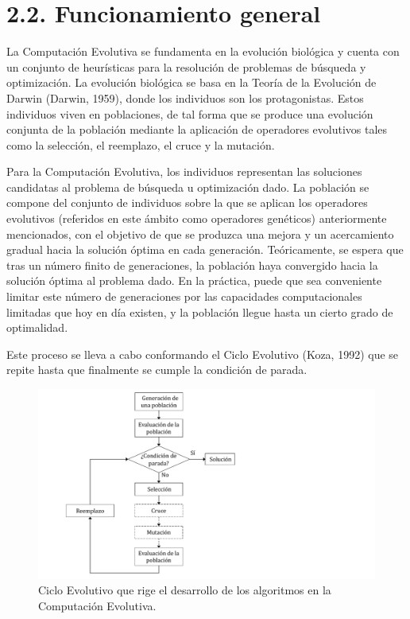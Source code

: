 \documentclass[spanish,a4paper,12pt,twoside]{report}
\begin{document}
  \section*{\Large 2.2. Funcionamiento general}
  La Computación Evolutiva se fundamenta en la evolución biológica y cuenta con un conjunto de heurísticas para la resolución de problemas de búsqueda y optimización. La evolución biológica se basa en la Teoría de la Evolución de Darwin (Darwin, 1959), donde los individuos son los protagonistas. Estos individuos viven en poblaciones, de tal forma que se produce una evolución conjunta de la población mediante la aplicación de operadores evolutivos tales como la selección, el reemplazo, el cruce y la mutación. \par
  Para la Computación Evolutiva, los individuos representan las soluciones candidatas al problema de búsqueda u optimización dado. La población se compone del conjunto de individuos sobre la que se aplican los operadores evolutivos (referidos en este ámbito como operadores genéticos) anteriormente mencionados, con el objetivo de que se produzca una mejora y un acercamiento gradual hacia la solución óptima en cada generación. Teóricamente, se espera que tras un número finito de generaciones, la población haya convergido hacia la solución óptima al problema dado. En la práctica, puede que sea conveniente limitar este número de generaciones por las capacidades computacionales limitadas que hoy en día existen, y la población llegue hasta un cierto grado de optimalidad. \par
  Este proceso se lleva a cabo conformando el Ciclo Evolutivo (Koza, 1992) que se repite hasta que finalmente se cumple la condición de parada.
  \begin{figure}[H]
    \centering
    \includegraphics[width = 1.5\textwidth]{resources/Fig1.pdf}
    \caption{Ciclo Evolutivo que rige el desarrollo de los algoritmos en la Computación Evolutiva.}
    \label{fig:1}
  \end{figure}
\end{document}
